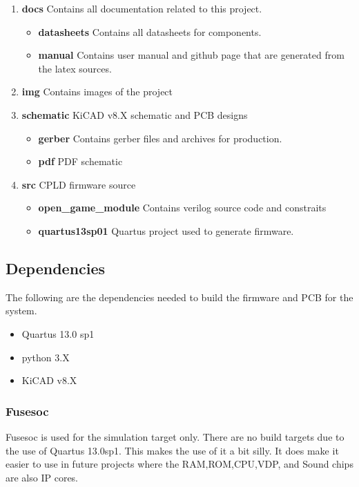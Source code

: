 \begin{enumerate}
  \item \textbf{docs} Contains all documentation related to this project.
    \begin{itemize}
      \item \textbf{datasheets} Contains all datasheets for components.
      \item \textbf{manual} Contains user manual and github page that are generated from the latex sources.
    \end{itemize}
  \item \textbf{img} Contains images of the project
  \item \textbf{schematic} KiCAD v8.X schematic and PCB designs
    \begin{itemize}
      \item \textbf{gerber} Contains gerber files and archives for production.
      \item \textbf{pdf} PDF schematic
    \end{itemize}
  \item \textbf{src} CPLD firmware source
    \begin{itemize}
      \item \textbf{open\_game\_module} Contains verilog source code and constraits
      \item \textbf{quartus13sp01} Quartus project used to generate firmware.
    \end{itemize}
\end{enumerate}

\subsection{Dependencies}

\par
The following are the dependencies needed to build the firmware and PCB for the system.

\begin{itemize}
  \item Quartus 13.0 sp1
  \item python 3.X
  \item KiCAD v8.X
\end{itemize}



\subsubsection{Fusesoc}
\par
Fusesoc is used for the simulation target only. There are no build targets due to the use of Quartus 13.0sp1.
This makes the use of it a bit silly. It does make it easier to use in future projects where the RAM,ROM,CPU,VDP,
and Sound chips are also IP cores.

